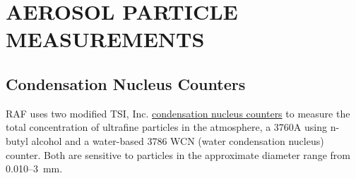 
\section{AEROSOL PARTICLE MEASUREMENTS\label{sec:AEROSOL-PARTICLE-MEASUREMENTS}}

\subsection{Condensation Nucleus Counters}

RAF uses two modified TSI, Inc. \href{http://www.eol.ucar.edu/instruments/condensation-nucleus-counter-water-or-butanol}{condensation nucleus counters}
to measure the total concentration of ultrafine particles
in the atmosphere, a 3760A using n-butyl
alcohol and a water-based 3786 WCN (water
condensation nucleus) counter. Both are sensitive to particles in
the approximate diameter range from 0.010--3~\textgreek{m}m. \\

